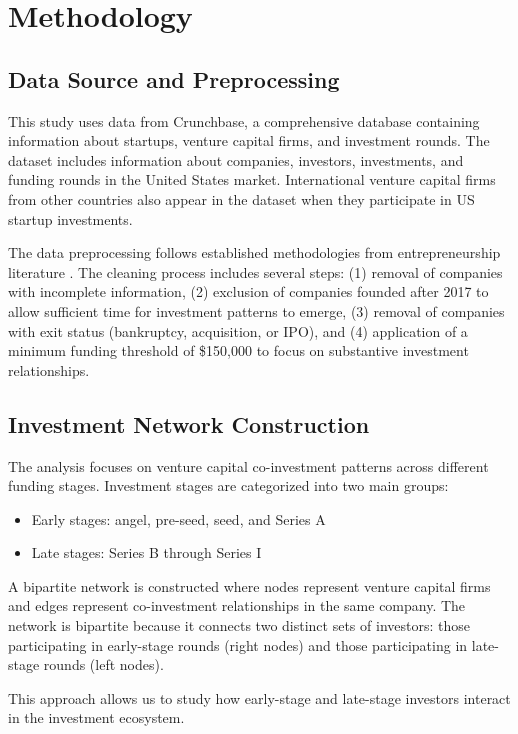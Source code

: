 \section{Methodology}

\subsection{Data Source and Preprocessing}

This study uses data from Crunchbase, a comprehensive database containing information about startups, venture capital firms, and investment rounds. The dataset includes information about companies, investors, investments, and funding rounds in the United States market. International venture capital firms from other countries also appear in the dataset when they participate in US startup investments.

The data preprocessing follows established methodologies from entrepreneurship literature \cite{Dalle2025}. The cleaning process includes several steps: (1) removal of companies with incomplete information, (2) exclusion of companies founded after 2017 to allow sufficient time for investment patterns to emerge, (3) removal of companies with exit status (bankruptcy, acquisition, or IPO), and (4) application of a minimum funding threshold of \$150,000 to focus on substantive investment relationships.

\subsection{Investment Network Construction}

The analysis focuses on venture capital co-investment patterns across different funding stages. Investment stages are categorized into two main groups:
\begin{itemize}
    \item Early stages: angel, pre-seed, seed, and Series A
    \item Late stages: Series B through Series I
\end{itemize}

A bipartite network is constructed where nodes represent venture capital firms and edges represent co-investment relationships in the same company. The network is bipartite because it connects two distinct sets of investors: those participating in early-stage rounds (right nodes) and those participating in late-stage rounds (left nodes).

This approach allows us to study how early-stage and late-stage investors interact in the investment ecosystem.

